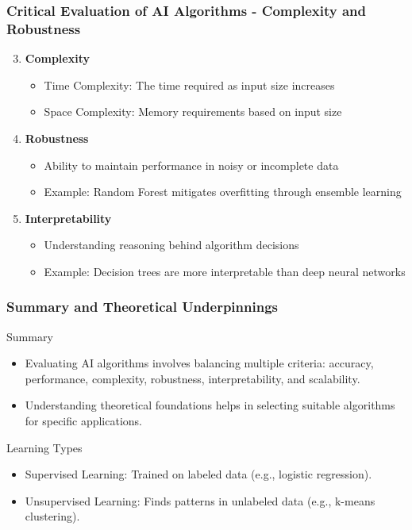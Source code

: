 \documentclass[aspectratio=169]{beamer}
\begin{document}
\begin{frame}[fragile]
    \frametitle{Critical Evaluation of AI Algorithms - Complexity and Robustness}
    \begin{enumerate}
        \setcounter{enumi}{2}
        \item \textbf{Complexity}
            \begin{itemize}
                \item Time Complexity: The time required as input size increases
                \item Space Complexity: Memory requirements based on input size
            \end{itemize}
        \item \textbf{Robustness}
            \begin{itemize}
                \item Ability to maintain performance in noisy or incomplete data
                \item Example: Random Forest mitigates overfitting through ensemble learning
            \end{itemize}
        \item \textbf{Interpretability}
            \begin{itemize}
                \item Understanding reasoning behind algorithm decisions
                \item Example: Decision trees are more interpretable than deep neural networks
            \end{itemize}
    \end{enumerate}
\end{frame}

\begin{frame}[fragile]
    \frametitle{Summary and Theoretical Underpinnings}
    \begin{block}{Summary}
        \begin{itemize}
            \item Evaluating AI algorithms involves balancing multiple criteria: accuracy, performance, complexity, robustness, interpretability, and scalability.
            \item Understanding theoretical foundations helps in selecting suitable algorithms for specific applications.
        \end{itemize}
    \end{block}
    
    \begin{block}{Learning Types}
        \begin{itemize}
            \item Supervised Learning: Trained on labeled data (e.g., logistic regression).
            \item Unsupervised Learning: Finds patterns in unlabeled data (e.g., k-means clustering).
        \end{itemize}
    \end{block}
\end{frame}
\end{document}
